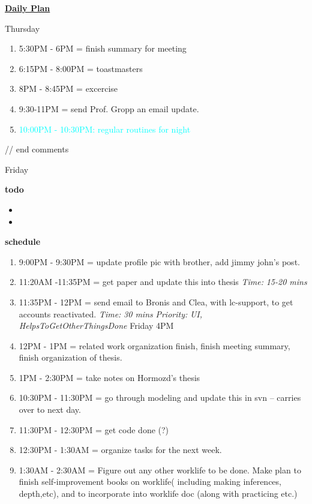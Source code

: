 \documentclass[serif,mathserif,final]{beamer}
\newcommand{\timeEst}[1]{\textit{Time:} \textit{#1}}
\newcommand{\priority}[1]{\textit{Priority:} \textit{#1}}
\newcommand{\regItem}[1]{\item \textcolor{cyan}{#1}}
\newcommand{\deadline}[1]{#1}
\begin{document}
\begin{frame}{}
\begin{columns}[t]
\begin{column}{0.27\linewidth}{\textbf{\underline{Daily Plan}}}
{\begin{block}{\small Thursday}
\begin{enumerate}
\item \tiny 5:30PM - 6PM = finish summary for meeting 
\item \tiny 6:15PM - 8:00PM = toastmasters 
\item \tiny 8PM - 8:45PM = excercise 

\item \tiny 9:30-11PM = send Prof. Gropp an email update. 
\regItem{10:00PM - 10:30PM: regular routines for night}
  \end{enumerate}
\end{block}
} // end comments 
\begin{block} {\small Friday} 

\textbf{todo} 
\begin{itemize} 
\item \tiny 
\item \tiny
\end{itemize} 

\textbf{schedule}
\begin{enumerate} 
\tiny \item \tiny 9:00PM - 9:30PM  =  update profile pic with brother, add jimmy john's post.

\item \tiny 11:20AM -11:35PM = get paper and update this into thesis \timeEst{15-20 mins} 
\item 11:35PM - 12PM = send email to Bronis and Clea, with lc-support, to get accounts reactivated. \timeEst{30 mins} \priority{UI, HelpsToGetOtherThingsDone} \deadline{Friday 4PM}  

\item \tiny 12PM - 1PM  = related work organization finish, finish meeting summary, finish organization of thesis. 

\item 1PM - 2:30PM = take notes on Hormozd's thesis 

\item \tiny 10:30PM - 11:30PM = go through modeling and update this in svn -- carries over to next day.

\item 11:30PM - 12:30PM =  get code done (?) 

\item 12:30PM - 1:30AM = organize tasks for the next week.

\item 1:30AM - 2:30AM = Figure out any other worklife to be done. Make plan to finish self-improvement books on worklife(
including making inferences, depth,etc), and to incorporate into worklife doc (along with practicing etc.) 


\end{enumerate}
\end{block}
\end{column}
\end{columns}
\end{frame}
\end{document}
